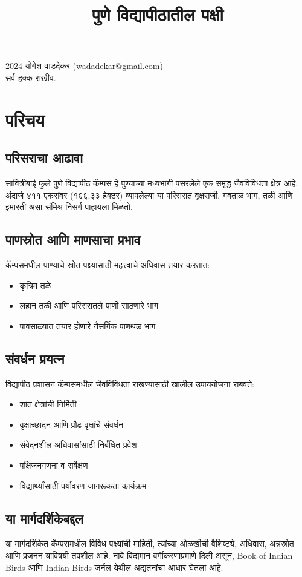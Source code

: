 \documentclass[a4paper,12pt,landscape]{memoir}
\title{पुणे विद्यापीठातील पक्षी}
\author{}
\date{}
\newcommand{\introsection}[2]{%
  \begin{minipage}[t]{0.48\textwidth}
    \begin{mdframed}[
      linecolor=headingcolor,
      linewidth=1pt,
      roundcorner=5pt,
      leftmargin=0pt,
      rightmargin=0pt,
      backgroundcolor=headingcolor!5
    ]
      #1
    \end{mdframed}
  \end{minipage}\hfill
  \begin{minipage}[t]{0.48\textwidth}
    \begin{mdframed}[
      linecolor=headingcolor,
      linewidth=1pt,
      roundcorner=5pt,
      leftmargin=0pt,
      rightmargin=0pt,
      backgroundcolor=headingcolor!5
    ]
      #2
    \end{mdframed}
  \end{minipage}
  \newpage
}
\begin{document}
\maketitle

\begin{center}
\vspace{1cm}
{\large{\latintext \textcopyright} 2024 योगेश वाडदेकर {\latintext (wadadekar@gmail.com)}}\\
सर्व हक्क राखीव.
\end{center}

\tableofcontents

\chapter*{परिचय}
\introsection{%
  \section*{परिसराचा आढावा}
  सावित्रीबाई फुले पुणे विद्यापीठ कॅम्पस हे पुण्याच्या मध्यभागी पसरलेले एक समृद्ध जैवविविधता क्षेत्र आहे. अंदाजे ४११ एकरांवर (१६६.३३ हेक्टर) व्यापलेल्या या परिसरात वृक्षराजी, गवताळ भाग, तळी आणि इमारती असा संमिश्र निसर्ग पाहायला मिळतो. 
}{%
  \section*{पाणस्रोत आणि माणसाचा प्रभाव}
  कॅम्पसमधील पाण्याचे स्रोत पक्ष्यांसाठी महत्त्वाचे अधिवास तयार करतात:
  \begin{itemize}
  \item कृत्रिम तळे
  \item लहान तळी आणि परिसरातले पाणी साठणारे भाग
  \item पावसाळ्यात तयार होणारे नैसर्गिक पाणथळ भाग
  \end{itemize}
}

\introsection{%
  \section*{संवर्धन प्रयत्न}
  विद्यापीठ प्रशासन कॅम्पसमधील जैवविविधता राखण्यासाठी खालील उपाययोजना राबवते:
  \begin{itemize}
  \item शांत क्षेत्रांची निर्मिती
  \item वृक्षाच्छादन आणि प्रौढ वृक्षांचे संवर्धन
  \item संवेदनशील अधिवासांसाठी निर्बंधित प्रवेश
  \item पक्षिजनगणना व सर्वेक्षण
  \item विद्यार्थ्यांसाठी पर्यावरण जागरूकता कार्यक्रम
  \end{itemize}
}{%
  \section*{या मार्गदर्शिकेबद्दल}
  या मार्गदर्शिकेत कॅम्पसमधील विविध पक्ष्यांची माहिती, त्यांच्या ओळखीची वैशिष्ट्ये, अधिवास, अन्नस्रोत आणि प्रजनन याविषयी तपशील आहे. नावे विद्यमान वर्गीकरणाप्रमाणे दिली असून, Book of Indian Birds आणि Indian Birds जर्नल येथील अद्यतनांचा आधार घेतला आहे.
}
\end{document}
